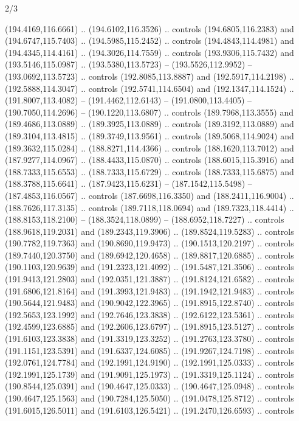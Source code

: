 \begin{flagdescription}{2/3}
\begin{scope}[xshift=0.5\flaglength,yshift=0.5\flagwidth,scale=\flagwidth/180]
\begin{scope}[y=0.8pt, x=0.8pt, yscale=-1,shift={(-168.75,-108.75)}]
  (194.4169,116.6661) .. (194.6102,116.3526) .. controls (194.6805,116.2383) and
  (194.6747,115.7403) .. (194.5985,115.2452) .. controls (194.4843,114.4981) and
  (194.4345,114.4161) .. (194.3026,114.7559) .. controls (193.9306,115.7432) and
  (193.5146,115.0987) .. (193.5380,113.5723) -- (193.5526,112.9952) --
  (193.0692,113.5723) .. controls (192.8085,113.8887) and (192.5917,114.2198) ..
  (192.5888,114.3047) .. controls (192.5741,114.6504) and (192.1347,114.1524) ..
  (191.8007,113.4082) -- (191.4462,112.6143) -- (191.0800,113.4405) --
  (190.7050,114.2696) -- (190.1220,113.6807) .. controls (189.7968,113.3555) and
  (189.4686,113.0889) .. (189.3925,113.0889) .. controls (189.3192,113.0889) and
  (189.3104,113.4815) .. (189.3749,113.9561) .. controls (189.5068,114.9024) and
  (189.3632,115.0284) .. (188.8271,114.4366) .. controls (188.1620,113.7012) and
  (187.9277,114.0967) .. (188.4433,115.0870) .. controls (188.6015,115.3916) and
  (188.7333,115.6553) .. (188.7333,115.6729) .. controls (188.7333,115.6875) and
  (188.3788,115.6641) .. (187.9423,115.6231) -- (187.1542,115.5498) --
  (187.4853,116.0567) .. controls (187.6698,116.3350) and (188.2411,116.9004) ..
  (188.7626,117.3135) .. controls (189.7118,118.0694) and (189.7323,118.4414) ..
  (188.8153,118.2100) -- (188.3524,118.0899) -- (188.6952,118.7227) .. controls
  (188.9618,119.2031) and (189.2343,119.3906) .. (189.8524,119.5283) .. controls
  (190.7782,119.7363) and (190.8690,119.9473) .. (190.1513,120.2197) .. controls
  (189.7440,120.3750) and (189.6942,120.4658) .. (189.8817,120.6885) .. controls
  (190.1103,120.9639) and (191.2323,121.4092) .. (191.5487,121.3506) .. controls
  (191.9413,121.2803) and (192.0351,121.3887) .. (191.8124,121.6582) .. controls
  (191.6806,121.8164) and (191.3993,121.9483) .. (191.1942,121.9483) .. controls
  (190.5644,121.9483) and (190.9042,122.3965) .. (191.8915,122.8740) .. controls
  (192.5653,123.1992) and (192.7646,123.3838) .. (192.6122,123.5361) .. controls
  (192.4599,123.6885) and (192.2606,123.6797) .. (191.8915,123.5127) .. controls
  (191.6103,123.3838) and (191.3319,123.3252) .. (191.2763,123.3780) .. controls
  (191.1151,123.5391) and (191.6337,124.6085) .. (191.9267,124.7198) .. controls
  (192.0761,124.7784) and (192.1991,124.9190) .. (192.1991,125.0333) .. controls
  (192.1991,125.1739) and (191.9091,125.1973) .. (191.3319,125.1124) .. controls
  (190.8544,125.0391) and (190.4647,125.0333) .. (190.4647,125.0948) .. controls
  (190.4647,125.1563) and (190.7284,125.5050) .. (191.0478,125.8712) .. controls
  (191.6015,126.5011) and (191.6103,126.5421) .. (191.2470,126.6593) .. controls

\end{scope}
\end{scope}
\end{flagdescription}
